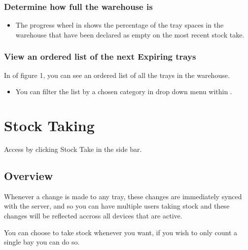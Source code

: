 \documentclass[letterpaper,10pt,english]{sphinxmanual}
\let\sphinxpxdimen\pdfpxdimen\else\newdimen\sphinxpxdimen
\let\oldsubsection\subsection
\renewcommand{\subsection}{\needspace{6\baselineskip}\oldsubsection}
\begin{document}
\subsubsection{Determine how full the warehouse is}
\label{\detokenize{docs/ui/reports:determine-how-full-the-warehouse-is}}\begin{itemize}
\item {} 
The progress wheel in  shows the percentage of the tray
spaces in the warehouse that have been declared as empty on the most
recent stock take.

\end{itemize}


\subsubsection{View an ordered list of the next Expiring trays}
\label{\detokenize{docs/ui/reports:view-an-ordered-list-of-the-next-expiring-trays}}
In  of figure 1, you can see an ordered list of all the
trays in the warehouse.
\begin{itemize}
\item {} 
You can filter the list by a chosen category in drop down menu within
.

\end{itemize}

\noindent{\hspace*{\fill}\sphinxincludegraphics[width=500\sphinxpxdimen]{{section3}.jpg}\hspace*{\fill}}


\section{Stock Taking}
\label{\detokenize{docs/ui/stocktaking:stock-taking}}\label{\detokenize{docs/ui/stocktaking::doc}}
Access by clicking Stock Take in the side bar.


\subsection{Overview}
\label{\detokenize{docs/ui/stocktaking:overview}}
Whenever a change is made to any tray, these changes are immediately
synced with the server, and so you can have multiple users taking stock
and these changes will be reflected accross all devices that are active.

You can choose to take stock whenever you want, if you wish to only
count a single bay you can do so.
\end{document}
